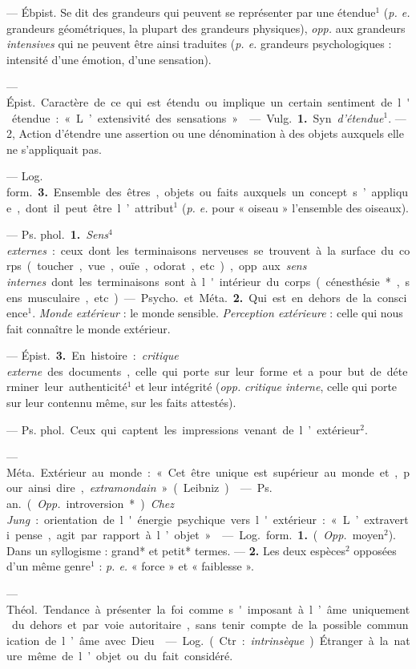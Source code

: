 \begin{itemize}[leftmargin=1cm, label=, itemsep=1pt]
 — Ébpist. Se dit des grandeurs qui peuvent se représenter par
une étendue$^1$ ({\it p. e.} grandeurs géométriques, la plupart des grandeurs
physiques), {\it opp.} aux grandeurs {\it intensives} qui ne peuvent être
ainsi traduites ({\it p. e.} grandeurs psychologiques : intensité d'une
émotion, d’une sensation).

 — \si{Épist.} Caractère de ce
qui est étendu ou implique un certain
sentiment de l'étendue : « L’extensivité des sensations ».

 — \si{Vulg.} {\bf 1.} Syn. {\it d’étendue}$^1$.
— 2, Action d'étendre une assertion ou une dénomination à des
objets auxquels elle ne s’appliquait
pas.

— \si{Log. form.} {\bf 3.} Ensemble des êtres, objets ou faits auxquels un
concept s’applique, dont il peut être l’attribut$^1$ ({\it p. e.} pour
« oiseau » l’ensemble des oiseaux).

 — \si{Ps. phol.} {\bf 1.}
{\it Sens$^4$ externes} : ceux dont les terminaisons nerveuses se trouvent à
la surface du corps (toucher, vue,
ouïe, odorat, etc.), opp. aux {\it sens
internes} dont les terminaisons sont
à l'intérieur du corps (cénesthésie*,
sens musculaire, etc.).

— \si{Psycho.} et \si{Méta.} {\bf 2.} Qui est en
dehors de la conscience$^1$. {\it Monde extérieur} : le monde sensible.
{\it Perception extérieure} : celle qui nous fait
connaître le monde extérieur.

— \si{Épist.} {\bf 3.} En histoire : {\it critique
externe} des documents, celle qui porte sur leur forme et a pour but
de déterminer leur authenticité$^1$ et
leur intégrité ({\it opp.} {\it critique interne},
celle qui porte sur leur contennu même, sur les faits attestés).

 — \si{Ps. phol.}
Ceux qui captent les impressions venant de l’extérieur$^2$.

 — \si{Méta.} Extérieur au
monde : « Cet être unique est supérieur au monde et, pour ainsi dire,
{\it extramondain} » (Leibniz).

 — \si{Ps. an.} ({\it Opp.}
introversion*) {\it Chez Jung} : orientation de l'énergie psychique vers
l'extérieur : « L’extraverti pense, agit par rapport à l’objet. »

 — \si{Log.} \si{form.} {\bf 1.} ({\it Opp.}
moyen$^2$). Dans un syllogisme : grand* et petit* termes.
— {\bf 2.} Les deux espèces$^2$ opposées d’un même genre$^1$ :
{\it p. e.} « force » et « faiblesse ».

 — \si{Théol.} Tendance à présenter la foi comme
s'imposant à l’âme uniquement du dehors et par voie autoritaire, sans
tenir compte de la possible communication de l’âme avec Dieu.

 — \si{Log.} (Ctr. : {\it intrinsèque}) Étranger à la
nature même de l’objet ou du fait considéré.

	\end{itemize}
